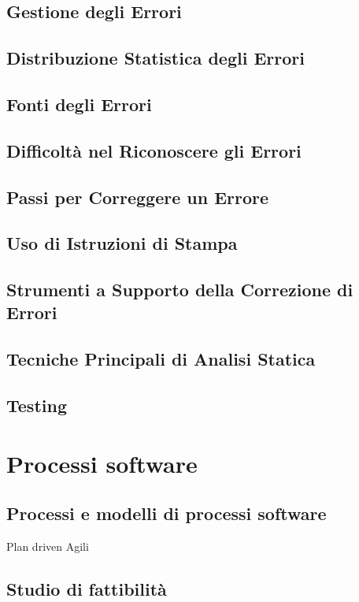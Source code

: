 \documentclass{article}
\begin{document}
	\subsection{Gestione degli Errori}
	\subsection{Distribuzione Statistica degli Errori}
	\subsection{Fonti degli Errori}
	\subsection{Difficoltà nel Riconoscere gli Errori}
	\subsection{Passi per Correggere un Errore}
	\subsection{Uso di Istruzioni di Stampa}
	\subsection{Strumenti a Supporto della Correzione di Errori}
	\subsection{Tecniche Principali di Analisi Statica}
	\subsection{Testing}
	
	\section{Processi software}
	\subsection{Processi e modelli di processi software}
	Plan driven
	Agili
	\subsection{Studio di fattibilità}
\end{document}
